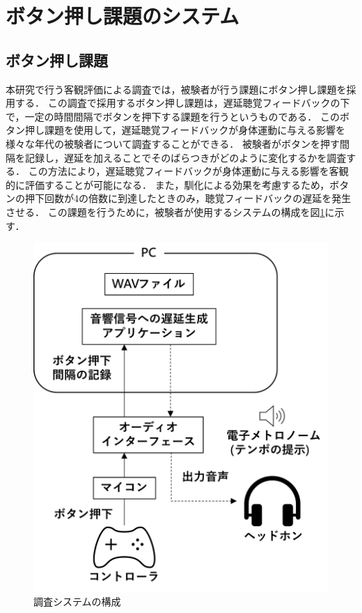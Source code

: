 \section{ボタン押し課題のシステム}
\subsection{ボタン押し課題}
本研究で行う客観評価による調査では，被験者が行う課題にボタン押し課題を採用する．
この調査で採用するボタン押し課題は，遅延聴覚フィードバックの下で，一定の時間間隔でボタンを押下する課題を行うというものである．
このボタン押し課題を使用して，遅延聴覚フィードバックが身体運動に与える影響を様々な年代の被験者について調査することができる．
被験者がボタンを押す間隔を記録し，遅延を加えることでそのばらつきがどのように変化するかを調査する．
この方法により，遅延聴覚フィードバックが身体運動に与える影響を客観的に評価することが可能になる．
また，馴化による効果を考慮するため，ボタンの押下回数が4の倍数に到達したときのみ，聴覚フィードバックの遅延を発生させる．
この課題を行うために，被験者が使用するシステムの構成を図\ref{fig:button-click-system}に示す．
\begin{figure}[tb]
  \centering
  \includegraphics[scale=0.15]{figures/system_button_click.pdf}
  \caption{調査システムの構成}
  \label{fig:button-click-system}
\end{figure}
